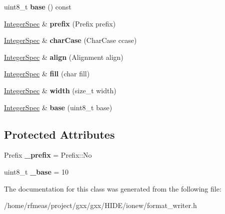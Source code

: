\begin{DoxyCompactItemize}
\item 
uint8\+\_\+t {\bfseries base} () const \hypertarget{classgxx_1_1io_1_1IntegerSpec_a4dfab96d86e8f1e390f8e460708df353}{}\label{classgxx_1_1io_1_1IntegerSpec_a4dfab96d86e8f1e390f8e460708df353}

\item 
\hyperlink{classgxx_1_1io_1_1IntegerSpec}{Integer\+Spec} \& {\bfseries prefix} (Prefix prefix)\hypertarget{classgxx_1_1io_1_1IntegerSpec_a5fbabc2553e9f718113f5092ebe07478}{}\label{classgxx_1_1io_1_1IntegerSpec_a5fbabc2553e9f718113f5092ebe07478}

\item 
\hyperlink{classgxx_1_1io_1_1IntegerSpec}{Integer\+Spec} \& {\bfseries char\+Case} (Char\+Case ccase)\hypertarget{classgxx_1_1io_1_1IntegerSpec_af1c607a88a0b9532e85fa63ae3330fc7}{}\label{classgxx_1_1io_1_1IntegerSpec_af1c607a88a0b9532e85fa63ae3330fc7}

\item 
\hyperlink{classgxx_1_1io_1_1IntegerSpec}{Integer\+Spec} \& {\bfseries align} (Alignment align)\hypertarget{classgxx_1_1io_1_1IntegerSpec_a2869a24de38b46107b897561156ff71f}{}\label{classgxx_1_1io_1_1IntegerSpec_a2869a24de38b46107b897561156ff71f}

\item 
\hyperlink{classgxx_1_1io_1_1IntegerSpec}{Integer\+Spec} \& {\bfseries fill} (char fill)\hypertarget{classgxx_1_1io_1_1IntegerSpec_a01a0bc39b1cdc2201715c576accd2f21}{}\label{classgxx_1_1io_1_1IntegerSpec_a01a0bc39b1cdc2201715c576accd2f21}

\item 
\hyperlink{classgxx_1_1io_1_1IntegerSpec}{Integer\+Spec} \& {\bfseries width} (size\+\_\+t width)\hypertarget{classgxx_1_1io_1_1IntegerSpec_a63906ada07305e26f8beb9a1640a70d9}{}\label{classgxx_1_1io_1_1IntegerSpec_a63906ada07305e26f8beb9a1640a70d9}

\item 
\hyperlink{classgxx_1_1io_1_1IntegerSpec}{Integer\+Spec} \& {\bfseries base} (uint8\+\_\+t base)\hypertarget{classgxx_1_1io_1_1IntegerSpec_af52740428fd5f35024eac37aec7f5908}{}\label{classgxx_1_1io_1_1IntegerSpec_af52740428fd5f35024eac37aec7f5908}

\end{DoxyCompactItemize}
\subsection*{Protected Attributes}
\begin{DoxyCompactItemize}
\item 
Prefix {\bfseries \+\_\+prefix} = Prefix\+::\+No\hypertarget{classgxx_1_1io_1_1IntegerSpec_a9000bfd6bcdf33e39c90bad0c9768d70}{}\label{classgxx_1_1io_1_1IntegerSpec_a9000bfd6bcdf33e39c90bad0c9768d70}

\item 
uint8\+\_\+t {\bfseries \+\_\+base} = 10\hypertarget{classgxx_1_1io_1_1IntegerSpec_ac2d1942cb2d997dd17877f175c2d63ca}{}\label{classgxx_1_1io_1_1IntegerSpec_ac2d1942cb2d997dd17877f175c2d63ca}

\end{DoxyCompactItemize}


The documentation for this class was generated from the following file\+:\begin{DoxyCompactItemize}
\item 
/home/rfmeas/project/gxx/gxx/\+H\+I\+D\+E/ionew/format\+\_\+writer.\+h\end{DoxyCompactItemize}
